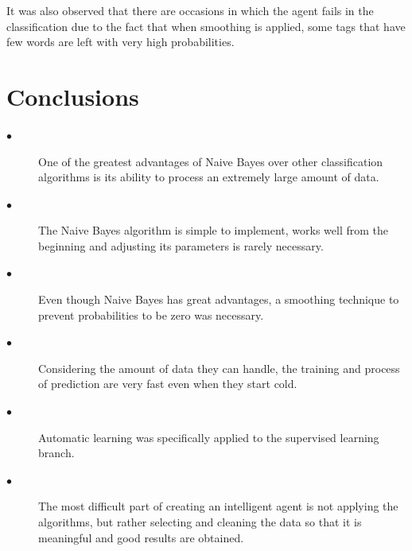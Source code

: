 \documentclass[sigconf,12pt,review=false,natbib=false]{acmart}
\begin{document}
It was also observed that there are occasions in which the agent fails in the classification due to the fact that when
smoothing is applied, some tags that have few words are left with very high probabilities. \\

\section{Conclusions}

\begin{description}

    \item[$\bullet$] One of the greatest advantages of Naive Bayes over other classification algorithms is its ability
      to process an extremely large amount of data. \\

  \item[$\bullet$] The Naive Bayes algorithm is simple to implement, works well from the beginning and adjusting its
      parameters is rarely necessary. \\

  \item[$\bullet$] Even though Naive Bayes has great advantages, a smoothing technique to prevent probabilities to be
      zero was necessary. \\

  \item[$\bullet$] Considering the amount of data they can handle, the training and process of prediction are very
      fast even when they start cold. \\

  \item[$\bullet$] Automatic learning was specifically applied to the supervised learning branch. \\

  \item[$\bullet$] The most difficult part of creating an intelligent agent is not applying the algorithms, but rather
      selecting and cleaning the data so that it is meaningful and good results are obtained. \\

\end{description}

\nocite{*}
\printbibliography
\end{document}
